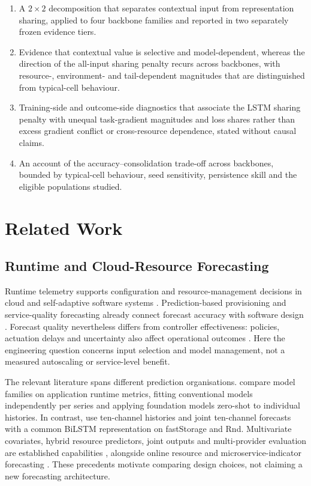 \documentclass[5p,twocolumn]{elsarticle}
\begin{document}
\begin{enumerate}
  \item A $2\times2$ decomposition that separates contextual input from
    representation sharing, applied to four backbone families and
    reported in two separately frozen evidence tiers.
  \item Evidence that contextual value is selective and model-dependent,
    whereas the direction of the all-input sharing penalty recurs across
    backbones, with resource-, environment- and tail-dependent magnitudes
    that are distinguished from typical-cell behaviour.
  \item Training-side and outcome-side diagnostics that associate the
    LSTM sharing penalty with unequal task-gradient magnitudes and loss
    shares rather than excess gradient conflict or cross-resource
    dependence, stated without causal claims.
  \item An account of the accuracy--consolidation trade-off across
    backbones, bounded by typical-cell behaviour, seed sensitivity,
    persistence skill and the eligible populations studied.
\end{enumerate}

\section{Related Work}
\label{sec:related-work}

\subsection{Runtime and Cloud-Resource Forecasting}
\label{sec:rw-runtime}

Runtime telemetry supports configuration and resource-management decisions in
cloud and self-adaptive software systems
\citep{Taherizadeh2018Monitoring,Bauer2020SelfAware}. Prediction-based
provisioning and service-quality forecasting already connect forecast accuracy
with software design
\citep{Calheiros2015ARIMA,Syu2017DynamicQoS}. Forecast quality nevertheless
differs from controller effectiveness: policies, actuation delays and
uncertainty also affect operational outcomes \citep{Qu2018Autoscaling}.
Here the engineering question concerns input selection and model management,
not a measured autoscaling or service-level benefit.

The relevant literature spans different prediction organisations.
\citet{DiMenna2026RuntimeForecasting} compare model families on application
runtime metrics, fitting conventional models independently per series and
applying foundation models zero-shot to individual histories. In contrast,
\citet{Ullah2023CloudBiLSTM} use ten-channel histories and joint ten-channel
forecasts with a common BiLSTM representation on fastStorage and Rnd.
Multivariate covariates, hybrid resource predictors, joint outputs and
multi-provider evaluation are established capabilities
\citep{Tran2018MultivariateFuzzy,Xu2022esDNN,Tripathi2025MMRP,
Rossi2025CloudUncertainty,Zhang2025SWTCLSTM}, alongside online resource and
microservice-indicator forecasting \citep{Gao2026OMCR,Gao2026MaMiClif}.
These precedents motivate comparing design choices, not claiming a new
forecasting architecture.
\end{document}
